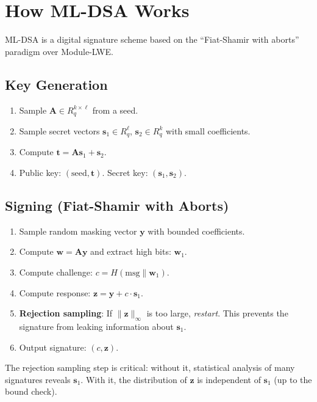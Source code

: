 \section{How ML-DSA Works}


ML-DSA is a digital signature scheme based on the ``Fiat-Shamir with aborts'' paradigm
over Module-LWE.

\subsection{Key Generation}

\begin{enumerate}[nosep]
  \item Sample $\mathbf{A} \in R_q^{k \times \ell}$ from a seed.
  \item Sample secret vectors $\mathbf{s}_1 \in R_q^\ell$, $\mathbf{s}_2 \in R_q^k$
    with small coefficients.
  \item Compute $\mathbf{t} = \mathbf{A}\mathbf{s}_1 + \mathbf{s}_2$.
  \item Public key: $(\text{seed}, \mathbf{t})$. Secret key: $(\mathbf{s}_1, \mathbf{s}_2)$.
\end{enumerate}

\subsection{Signing (Fiat-Shamir with Aborts)}

\begin{enumerate}[nosep]
  \item Sample random masking vector $\mathbf{y}$ with bounded coefficients.
  \item Compute $\mathbf{w} = \mathbf{A}\mathbf{y}$ and extract high bits: $\mathbf{w}_1$.
  \item Compute challenge: $c = H(\text{msg} \| \mathbf{w}_1)$.
  \item Compute response: $\mathbf{z} = \mathbf{y} + c \cdot \mathbf{s}_1$.
  \item \textbf{Rejection sampling}: If $\|\mathbf{z}\|_\infty$ is too large, \emph{restart}.
    This prevents the signature from leaking information about $\mathbf{s}_1$.
  \item Output signature: $(c, \mathbf{z})$.
\end{enumerate}

The rejection sampling step is critical: without it, statistical analysis of many
signatures reveals $\mathbf{s}_1$. With it, the distribution of $\mathbf{z}$ is
independent of $\mathbf{s}_1$ (up to the bound check).

